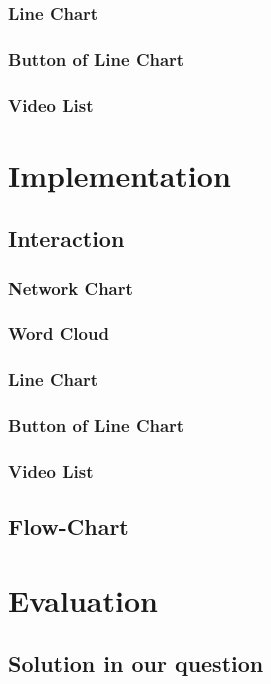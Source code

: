 \documentclass{report}
\numberwithin{figure}{section}
\begin{document}
\subsection{Line Chart}

\subsection{Button of Line Chart}

\subsection{Video List}

\chapter{Implementation}
\section{Interaction}
\subsection{Network Chart}
\subsection{Word Cloud}
\subsection{Line Chart}
\subsection{Button of Line Chart}
\subsection{Video List}

\section{Flow-Chart}

\chapter{Evaluation}
\section{Solution in our question}
 


\end{document}
